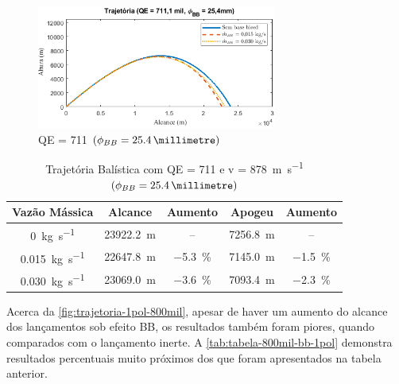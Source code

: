 \begin{figure}[!ht]
	\centering
    \includegraphics[width=0.7\textwidth]{foto1-qe711mil-1pol.png}
    \caption[QE = \qty{711}{\milliradian} \(\left(\phi_{BB} = \qty{25,4}{\millimetre}\right)\)]{QE = \qty{711}{\milliradian} \(\left(\phi_{BB} = \qty{25,4}{\millimetre}\right)\)}
    \label{fig:trajetoria-1pol-711mil}
\end{figure}

\begin{table}[ht]
\centering
\caption[Trajetória Balística com QE = \qty{711}{\milliradian} e v = \qty{878}{\metre\per\second} \(\left(\phi_{BB} = \qty{25,4}{\millimetre}\right)\)]{Trajetória Balística com QE = \qty{711}{\milliradian} e v = \qty{878}{\metre\per\second} \(\left(\phi_{BB} = \qty{25,4}{\millimetre}\right)\)}
\vspace{0.5cm}
\begin{tabular}{c|c|c|c|c}
Vazão Mássica & Alcance & Aumento & Apogeu & Aumento \\
\hline
\qty{0}{\kilogram\per\second} & \qty{23922,2}{\metre} & -- & \qty{7256,8}{\metre} & -- \\ 
\qty{0,015}{\kilogram\per\second} & \qty{22647,8}{\metre} & \qty{-5,3}{\percent} & \qty{7145,0}{\metre} & \qty{-1,5}{\percent} \\
\qty{0,030}{\kilogram\per\second} & \qty{23069,0}{\metre} & \qty{-3,6}{\percent} & \qty{7093,4}{\metre} & \qty{-2,3}{\percent}
\end{tabular}
\label{tab:tabela-711mil-bb-1pol}
\end{table}

Acerca da \autoref{fig:trajetoria-1pol-800mil}, apesar de haver um aumento do alcance dos lançamentos sob efeito BB, os resultados também foram piores, quando comparados com o lançamento inerte. A \autoref{tab:tabela-800mil-bb-1pol} demonstra resultados percentuais muito próximos dos que foram apresentados na tabela anterior.

